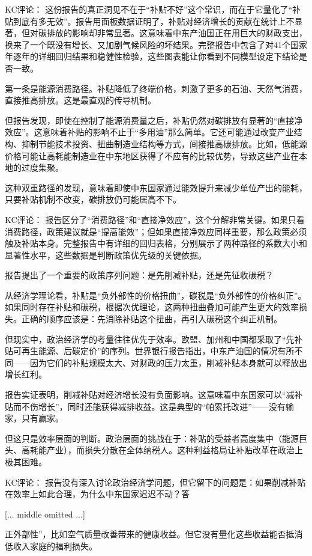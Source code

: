 \documentclass[11pt]{ctexart}
\begin{document}
KC评论： 这份报告的真正洞见不在于“补贴不好”这个常识，而在于它量化了“补贴到底有多无效”。报告用面板数据证明了，补贴对经济增长的贡献在统计上不显著，但对碳排放的影响却非常显著。这意味着中东产油国正在用巨大的财政支出，换来了一个既没有增长、又加剧气候风险的坏结果。完整报告中包含了对41个国家 年逐年的详细回归结果和稳健性检验，这些图表能让你看到不同模型设定下结论是否一致。

第一条是能源消费路径。补贴降低了终端价格，刺激了更多的石油、天然气消费，直接推高排放。这是最直观的传导机制。

但报告发现，即使在控制了能源消费量之后，补贴仍然对碳排放有显著的“直接净效应”。这意味着补贴的影响不止于“多用油”那么简单。它还可能通过改变产业结构、抑制节能技术投资、扭曲制造业结构等方式，间接推高碳排放。比如，低能源价格可能让高耗能制造业在中东地区获得了不应有的比较优势，导致这些产业在本地的过度集聚。

这种双重路径的发现，意味着即使中东国家通过能效提升来减少单位产出的能耗，只要补贴机制不改变，碳排放仍可能居高不下。

KC评论： 报告区分了“消费路径”和“直接净效应”，这个分解非常关键。如果只看消费路径，政策建议就是“提高能效”；但如果直接净效应同样重要，那么政策必须触及补贴本身。完整报告中有详细的回归表格，分别展示了两种路径的系数大小和显著性水平，这些数据是判断政策优先级的关键依据。

报告提出了一个重要的政策序列问题：是先削减补贴，还是先征收碳税？

从经济学理论看，补贴是“负外部性的价格扭曲”，碳税是“负外部性的价格纠正”。如果同时存在补贴和碳税，根据次优理论，这两种扭曲叠加可能产生更大的效率损失。正确的顺序应该是：先消除补贴这个扭曲，再引入碳税这个纠正机制。

但现实中，政治经济学的考量往往优先于效率。欧盟、加州和中国都采取了“先补贴可再生能源、后碳定价”的序列。世界银行报告指出，中东产油国的情况有所不同——因为它们的补贴规模太大、对财政的压力太重，削减补贴本身就可以释放出增长红利。

报告实证表明，削减补贴对经济增长没有负面影响。这意味着中东国家可以“减补贴而不伤增长”，同时还能获得减排收益。这是典型的“帕累托改进”——没有输家，只有赢家。

但这只是效率层面的判断。政治层面的挑战在于：补贴的受益者高度集中（能源巨头、高耗能产业），而损失分散在全体纳税人。这种利益格局让补贴改革在政治上极其困难。

KC评论： 报告没有深入讨论政治经济学问题，但它留下的问题是：如果削减补贴在效率上如此合理，为什么中东国家迟迟不动？答

[... middle omitted ...]

正外部性”，比如空气质量改善带来的健康收益。但它没有量化这些收益能否抵消低收入家庭的福利损失。
\end{document}
